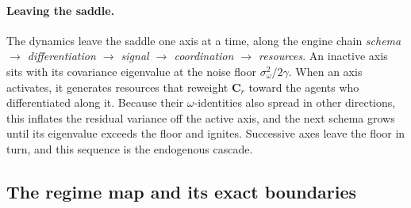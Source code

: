 \documentclass[
  aps,prx,
  reprint,
  superscriptaddress,
  nofootinbib,
  longbibliography
]{revtex4-2}
\newcommand{\Cr}{\mathbf{C}_r}
\newcommand{\sidn}{\sigma_{\omega}}
\begin{document}
\paragraph{Leaving the saddle.} The dynamics leave the saddle one axis at a time, along the engine chain \textit{schema $\to$ differentiation $\to$ signal $\to$ coordination $\to$ resources}. An inactive axis sits with its covariance eigenvalue at the noise floor $\sidn^2/2\gamma$. When an axis activates, it generates resources that reweight $\Cr$ toward the agents who differentiated along it. Because their $\omega$-identities also spread in other directions, this inflates the residual variance off the active axis, and the next schema grows until its eigenvalue exceeds the floor and ignites. Successive axes leave the floor in turn, and this sequence is the endogenous cascade.

\subsection{The regime map and its exact boundaries}\label{sec:regimes}
\end{document}
